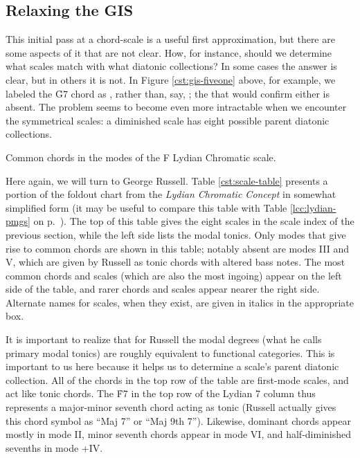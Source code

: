 \FloatBarrier
\subsection{Relaxing the GIS}
\label{subsec:relaxing-gis}

This initial pass at a chord-scale \gis is a useful first approximation, but
there are some aspects of it that are not clear. How, for instance, should we
determine what scales match with what diatonic collections? In some cases the
answer is clear, but in others it is not. In Figure \ref{cst:gis-fiveone}
above, for example, we labeled the \h{G7} chord as ,
rather than, say, ; the  that would confirm
either is absent. The problem seems to become even more intractable when we
encounter the symmetrical scales: a diminished scale has eight possible parent
diatonic collections.

\begin{table}[p]
  \caption{Common chords in the modes of the F Lydian Chromatic scale.}
  \label{cst:scale-table}
\end{table}

Here again, we will turn to George Russell. Table \ref{cst:scale-table}
presents a portion of the foldout chart from the \emph{Lydian Chromatic Concept}
in somewhat simplified form (it may be useful to compare this table with Table
\ref{lcc:lydian-pmgs} on p.~\pageref{lcc:lydian-pmgs}). The top of this table
gives the eight scales in the scale index of the previous section, while the
left side lists the modal tonics. Only modes that give rise to
common chords are shown in this table; notably absent are modes III and V,
which are given by Russell as tonic chords with altered bass notes. The most
common chords and scales (which are also the most ingoing) appear on the left
side of the table, and rarer chords and scales appear nearer the right side.
Alternate names for scales, when they exist, are given in italics in the
appropriate box.

It is important to realize that for Russell the modal degrees (what he calls
primary modal tonics) are roughly equivalent to functional categories. This is
important to us here because it helps us to determine a scale's parent
diatonic collection. All of the chords in the top row of the table are
first-mode scales, and act like tonic chords. The \h{F7} in the top row of the
Lydian \flat{}7 column thus represents a major-minor seventh chord acting as
tonic (Russell actually gives this chord symbol as ``Maj \flat{}7'' or ``Maj
9th \flat{}7''). Likewise, dominant chords appear mostly in mode II, minor
seventh chords appear in mode VI, and half-diminished sevenths in mode
+IV.

